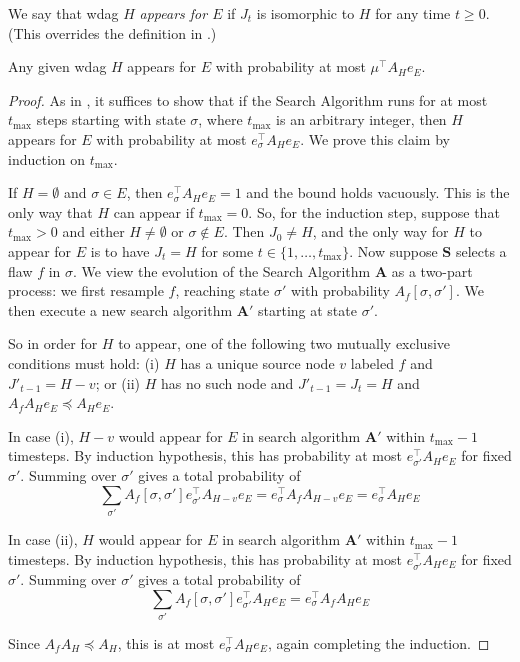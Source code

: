 \documentclass{toc}
\begin{document}
We say that wdag $H$ \emph{appears for $E$} if $J_t$ is isomorphic to $H$ for any time $t \geq 0$.  (This overrides the definition in .)

\begin{lemma}
\label{jtappear}
Any given wdag $H$ appears for $E$ with probability at most $\mu^{\top} A_H e_E$.
\end{lemma}
\begin{proof}
As in , it suffices to show that if the Search Algorithm runs for at most $t_{\max}$ steps starting with state $\sigma$, where $t_{\max}$ is an arbitrary integer, then $H$ appears for $E$ with probability at most $e_{\sigma}^{\top} A_H e_E.$ We prove this claim by induction on $t_{\max}$. 

If $H = \emptyset$ and $\sigma \in E$, then $e_{\sigma}^{\top} A_H e_E = 1$ and the bound holds vacuously. This is the only way that $H$ can appear if $t_{\max} = 0$. So, for the induction step, suppose that $t_{\max} > 0$ and either $H \neq \emptyset$ or $\sigma \not \in E$. Then $J_0 \neq H$, and the only way for $H$ to appear for $E$ is to have $J_t = H$ for some $t \in \{1, \dots, t_{\max} \}$. Now suppose $\mathbf S$ selects a flaw $f$  in $\sigma$. We view the evolution of the Search Algorithm $\mathbf A$ as a two-part process: we first resample $f$, reaching state $\sigma'$ with probability $A_{f}[ \sigma, \sigma']$. We then execute a new search algorithm $\mathbf A'$ starting at state $\sigma'$. 

So in order for $H$ to appear, one of the following two mutually exclusive conditions must hold:  (i) $H$ has a unique source node $v$ labeled $f$ and $J'_{t-1} = H - v$; or  (ii) $H$ has no such node and $J'_{t-1} = J_t = H$ and $A_f A_H e_E \preceq A_H e_E$.

In case (i), $H - v$ would appear for $E$ in search algorithm $\mathbf A'$ within $t_{\max} - 1$ timesteps. By induction hypothesis, this has  probability at most $e_{\sigma'}^{\top} A_H e_E$ for fixed $\sigma'$. Summing over $\sigma'$ gives a total probability of 
$$
\sum_{\sigma'} A_f[\sigma, \sigma'] e_{\sigma'}^{\top} A_{H-v} e_E = e_{\sigma}^{\top} A_f  A_{H-v} e_E = e_{\sigma}^{\top} A_H e_E
$$ 

In case (ii), $H $ would appear for $ E$ in search algorithm $\mathbf A'$ within $t_{\max} - 1$ timesteps. By induction hypothesis, this has  probability at most $e_{\sigma'}^{\top} A_H e_E$ for fixed $\sigma'$. Summing over $\sigma'$ gives a total probability of 
$$
\sum_{\sigma'} A_f[\sigma, \sigma'] e_{\sigma'}^{\top} A_{H} e_E = e_{\sigma}^{\top} A_f  A_{H} e_E
$$

Since $A_f A_H \preceq A_H$, this is at most $e_{\sigma}^{\top} A_H e_E$, again completing the induction.
\end{proof}
\end{document}
